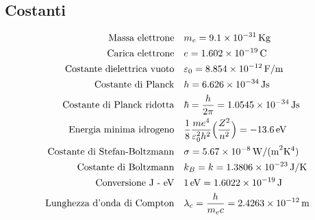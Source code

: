 \subsection{Costanti}
\begin{equation}
\begin{split}
\mbox{Massa elettrone} & \quad m_e = \SI{9.1e-31}{Kg} \\
\mbox{Carica elettrone} & \quad e = \SI{1.602e-19}{C} \\
\mbox{Costante dielettrica vuoto} & \quad \varepsilon_0 = \SI{8.854e-12}{F/m} \\
\mbox{Costante di Planck} & \quad h = \SI{6.626e-34}{J s} \\
\mbox{Costante di Planck ridotta} & \quad \hbar = \frac{ h}{2\pi } = \SI{1.0545e-34}{J s} \\
\mbox{Energia minima idrogeno} & \quad \frac{ 1}{8 }\frac{m e^4 }{\varepsilon_0^2 h^2 } \Bigl(  \frac{ Z^2}{n^2 }  \Bigr)= \SI{-13.6e0}{eV} \\
\mbox{Costante di Stefan-Boltzmann} & \quad \sigma = \SI{5.67e-8}{W / ( m^2 K^4)} \\
\mbox{Costante di Boltzmann} & \quad k_B = k = \SI{1.3806e-23}{J / K} \\
\mbox{Conversione J - eV} & \quad \SI{1 }{eV} = \SI{1.6022e-19}{J} \\
\mbox{Lunghezza d'onda di Compton} & \quad \lambda_c = \frac{ h}{m_e c } = \SI{2.4263e-12}{m} \\
\end{split}
\end{equation}

